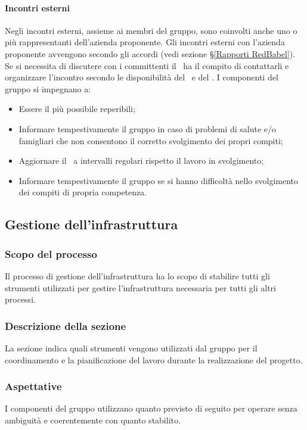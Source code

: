 \paragraph*{Incontri esterni}
Negli incontri esterni, assieme ai membri del gruppo, sono coinvolti anche uno o più rappresentanti dell'azienda proponente.
Gli incontri esterni con l'azienda proponente avvengono secondo gli accordi (vedi sezione \S\ref{Rapporti RedBabel}). Se si necessita di discutere con i committenti il \Responsabile\ ha il compito di contattarli e organizzare l'incontro secondo le disponibilità del \VT\ e del \CR.
\label{NormeGenerali}
I componenti del gruppo si impegnano a:
\begin{itemize}
	\item Essere il più possibile reperibili;
	\item Informare tempestivamente il gruppo in caso di problemi di salute e/o famigliari che non consentono il corretto svolgimento dei propri compiti;
	\item Aggiornare il \Responsabile\ a intervalli regolari rispetto il lavoro in svolgimento;
	\item Informare tempestivamente il gruppo se si hanno difficoltà nello svolgimento dei compiti di propria competenza.
\end{itemize}

\subsection{Gestione dell'infrastruttura}
\subsubsection{Scopo del processo}\label{PO_GestioneInfrastruttura_Scopo}
Il processo di gestione dell'infrastruttura ha lo scopo di stabilire tutti gli strumenti utilizzati per gestire l'infrastruttura necessaria per tutti gli altri processi.
\subsubsection{Descrizione della sezione}
La sezione indica quali strumenti vengono utilizzati dal gruppo per il coordinamento e la pianificazione del lavoro durante la realizzazione del progetto.
\subsubsection{Aspettative}
I componenti del gruppo utilizzano quanto previsto di seguito per operare senza ambiguità e coerentemente con quanto stabilito.
